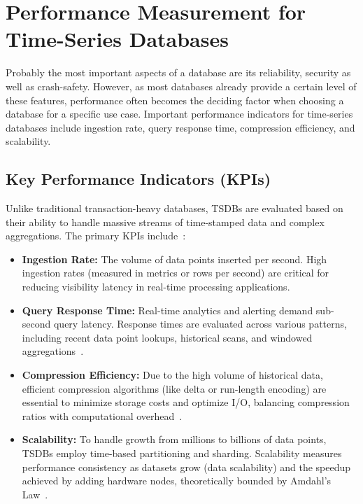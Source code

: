 \chapter{Performance Measurement for Time-Series Databases}

Probably the most important aspects of a database are its reliability,
security as well as crash-safety. However, as most databases already provide a
certain level of these features, performance often becomes the deciding factor
when choosing a database for a specific use case. Important performance
indicators for time-series databases include ingestion rate, query response
time, compression efficiency, and scalability.

\section{Key Performance Indicators (KPIs)}

Unlike traditional transaction-heavy databases, TSDBs are evaluated based on
their ability to handle massive streams of time-stamped data and complex
aggregations. The primary KPIs include~\cite{TSBS:01}:

\begin{itemize}
    \item \textbf{Ingestion Rate:} The volume of data points inserted per second. High ingestion rates (measured in metrics or rows per second) are critical for reducing visibility latency in real-time processing applications.
    \item \textbf{Query Response Time:} Real-time analytics and alerting demand
          sub-second query latency. Response times are evaluated across various patterns,
          including recent data point lookups, historical scans, and windowed
          aggregations~\cite{RTABench:01}.
    \item \textbf{Compression Efficiency:} Due to the high volume of historical data, efficient compression algorithms (like delta or run-length encoding) are essential to minimize storage costs and optimize I/O, balancing compression ratios with computational overhead~\cite{Compression:01}.
    \item \textbf{Scalability:} To handle growth from millions to billions of data points, TSDBs employ time-based partitioning and sharding. Scalability measures performance consistency as datasets grow (data scalability) and the speedup achieved by adding hardware nodes, theoretically bounded by Amdahl's Law~\cite{Amdahl:01}.
\end{itemize}

